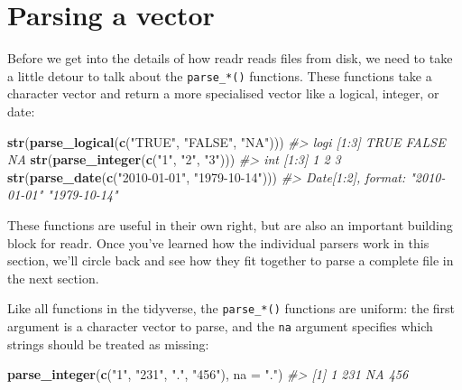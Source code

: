 \documentclass[]{book}
\newenvironment{Shaded}{\begin{snugshade}}{\end{snugshade}}
\newcommand{\KeywordTok}[1]{\textcolor[rgb]{0.13,0.29,0.53}{\textbf{{#1}}}}
\newcommand{\DataTypeTok}[1]{\textcolor[rgb]{0.13,0.29,0.53}{{#1}}}
\newcommand{\StringTok}[1]{\textcolor[rgb]{0.31,0.60,0.02}{{#1}}}
\newcommand{\CommentTok}[1]{\textcolor[rgb]{0.56,0.35,0.01}{\textit{{#1}}}}
\newcommand{\NormalTok}[1]{{#1}}
\begin{document}
\section{Parsing a vector}\label{parsing-a-vector}

Before we get into the details of how readr reads files from disk, we
need to take a little detour to talk about the \texttt{parse\_*()}
functions. These functions take a character vector and return a more
specialised vector like a logical, integer, or date:

\begin{Shaded}
\begin{Highlighting}[]
\KeywordTok{str}\NormalTok{(}\KeywordTok{parse_logical}\NormalTok{(}\KeywordTok{c}\NormalTok{(}\StringTok{"TRUE"}\NormalTok{, }\StringTok{"FALSE"}\NormalTok{, }\StringTok{"NA"}\NormalTok{)))}
\CommentTok{#>  logi [1:3] TRUE FALSE NA}
\KeywordTok{str}\NormalTok{(}\KeywordTok{parse_integer}\NormalTok{(}\KeywordTok{c}\NormalTok{(}\StringTok{"1"}\NormalTok{, }\StringTok{"2"}\NormalTok{, }\StringTok{"3"}\NormalTok{)))}
\CommentTok{#>  int [1:3] 1 2 3}
\KeywordTok{str}\NormalTok{(}\KeywordTok{parse_date}\NormalTok{(}\KeywordTok{c}\NormalTok{(}\StringTok{"2010-01-01"}\NormalTok{, }\StringTok{"1979-10-14"}\NormalTok{)))}
\CommentTok{#>  Date[1:2], format: "2010-01-01" "1979-10-14"}
\end{Highlighting}
\end{Shaded}

These functions are useful in their own right, but are also an important
building block for readr. Once you've learned how the individual parsers
work in this section, we'll circle back and see how they fit together to
parse a complete file in the next section.

Like all functions in the tidyverse, the \texttt{parse\_*()} functions
are uniform: the first argument is a character vector to parse, and the
\texttt{na} argument specifies which strings should be treated as
missing:

\begin{Shaded}
\begin{Highlighting}[]
\KeywordTok{parse_integer}\NormalTok{(}\KeywordTok{c}\NormalTok{(}\StringTok{"1"}\NormalTok{, }\StringTok{"231"}\NormalTok{, }\StringTok{"."}\NormalTok{, }\StringTok{"456"}\NormalTok{), }\DataTypeTok{na =} \StringTok{"."}\NormalTok{)}
\CommentTok{#> [1]   1 231  NA 456}
\end{Highlighting}
\end{Shaded}
\end{document}
